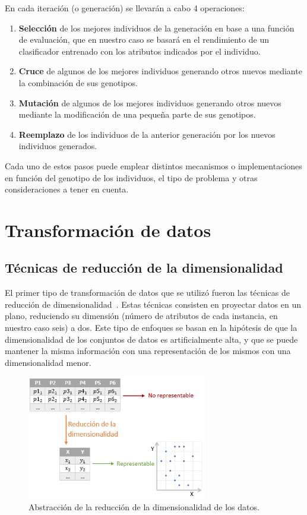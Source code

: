 En cada iteración (o generación) se llevarán a cabo 4 operaciones: 
\begin{enumerate}
	\item \textbf{Selección} de los mejores individuos de la generación en base a una función de evaluación, que en nuestro caso se basará en el rendimiento de un clasificador entrenado con los atributos indicados por el individuo. 
	\item \textbf{Cruce} de algunos de los mejores individuos generando otros nuevos mediante la combinación de sus genotipos. 
	\item\textbf{Mutación} de algunos de los mejores individuos generando otros nuevos mediante la modificación de una pequeña parte de sus genotipos.
	\item \textbf{Reemplazo} de los individuos de la anterior generación por los nuevos individuos generados.  
\end{enumerate}

Cada uno de estos pasos puede emplear distintos mecanismos o implementaciones en función del genotipo de los individuos, el tipo de problema y otras consideraciones a tener en cuenta. 

\section{Transformación de datos}

\subsection{Técnicas de reducción de la dimensionalidad}

El primer tipo de transformación de datos que se utilizó fueron las técnicas de reducción de dimensionalidad~\cite{fodor2002dimreduction}. Estas técnicas consisten en proyectar datos en un plano, reduciendo su dimensión (número de atributos de cada instancia, en nuestro caso seis) a dos. Este tipo de enfoques se basan en la hipótesis de que la dimensionalidad de los conjuntos de datos es artificialmente alta, y que se puede mantener la misma información con una representación de los mismos con una dimensionalidad menor. 

\begin{figure}[H]
	\centering
	\includegraphics[width=0.7\textwidth]{../img/reducdim.png}
	\caption{Abstracción de la reducción de la dimensionalidad de los datos.}
	\label{fig:reducdim}
\end{figure}


